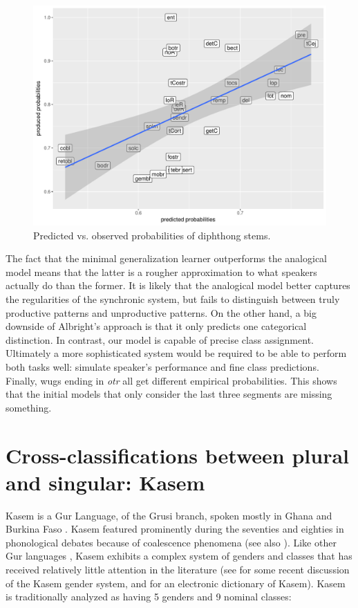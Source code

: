 \begin{figure}[!htpb]
  \centering
  \includegraphics[scale=0.6]{./figures/spanish/corr-plot.pdf}
  \caption{Predicted vs. observed probabilities of diphthong stems.}\label{fig:corr-plot}
\end{figure}

The fact that the minimal generalization learner outperforms the analogical model means that the latter is a rougher approximation to what speakers actually do than the former. It is likely that the analogical model better captures the regularities of the synchronic system, but fails to distinguish between truly productive patterns and unproductive patterns. On the other hand, a big downside of Albright's approach is that it only predicts one categorical distinction. In contrast, our model is capable of precise class assignment. Ultimately a more sophisticated system would be required to be able to perform both tasks well: simulate speaker's performance and fine class predictions. Finally, wugs ending in \textit{otr} all get different empirical probabilities. This shows that the initial models that only consider the last three segments are missing something.


\section{Cross-classifications between plural and singular: Kasem}


Kasem is a Gur Language, of the Grusi branch, spoken mostly in Ghana and Burkina Faso \autocite{Naden.1988}. Kasem featured prominently during the seventies and eighties in phonological debates \autocites{Phelps.1975, Phelps.1979, Halle.1978, deHaas.1987, deHaas.1988} because of coalescence phenomena (see also \citealt{Zaleska.forth.}). Like other Gur languages \autocite{Naden.1989}, Kasem exhibits a complex system of genders and classes that has received relatively little attention in the literature (see \textcite{Awedoba.2003} for some recent discussion of the Kasem gender system, and \textcite{Niggli.2016} for an electronic dictionary of Kasem). Kasem is traditionally analyzed as having 5 genders and 9 nominal classes:

